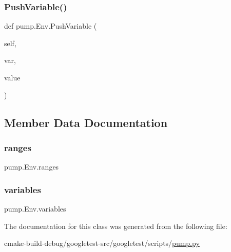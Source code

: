 \mbox{\label{classpump_1_1Env_ae0abc25733c61a8cc010cc5d76dd0dd8}} 
\subsubsection{\texorpdfstring{PushVariable()}{PushVariable()}}
{\footnotesize\ttfamily def pump.\+Env.\+Push\+Variable (\begin{DoxyParamCaption}\item[{}]{self,  }\item[{}]{var,  }\item[{}]{value }\end{DoxyParamCaption})}



\subsection{Member Data Documentation}
\mbox{\label{classpump_1_1Env_a8d5fec087c1a9108de9b105922b34309}} 
\subsubsection{\texorpdfstring{ranges}{ranges}}
{\footnotesize\ttfamily pump.\+Env.\+ranges}

\mbox{\label{classpump_1_1Env_aba6456f3d0d23ac92bc9508c1b966bcd}} 
\subsubsection{\texorpdfstring{variables}{variables}}
{\footnotesize\ttfamily pump.\+Env.\+variables}



The documentation for this class was generated from the following file\+:\begin{DoxyCompactItemize}
\item 
cmake-\/build-\/debug/googletest-\/src/googletest/scripts/\mbox{\hyperlink{pump_8py}{pump.\+py}}\end{DoxyCompactItemize}
